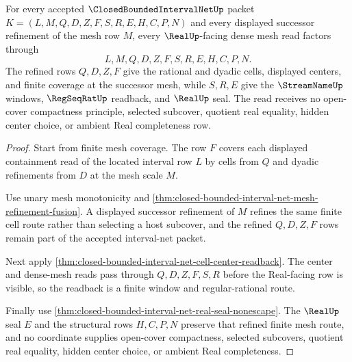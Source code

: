 \begin{theorem}
\label{thm:closed-bounded-interval-net-dense-mesh-readback}
For every accepted $\ClosedBoundedIntervalNetUp$ packet $K=(L,M,Q,D,Z,F,S,R,E,H,C,P,N)$ and every displayed successor refinement of the mesh row $M$, every $\RealUp$-facing dense mesh read factors through
$$
L,M,Q,D,Z,F,S,R,E,H,C,P,N.
$$
The refined rows $Q,D,Z,F$ give the rational and dyadic cells, displayed centers, and finite coverage at the successor mesh, while $S,R,E$ give the $\StreamNameUp$ windows, $\RegSeqRatUp$ readback, and $\RealUp$ seal. The read receives no open-cover compactness principle, selected subcover, quotient real equality, hidden center choice, or ambient Real completeness row.
\end{theorem}
\begin{proof}
Start from finite mesh coverage. The row $F$ covers each displayed containment read of the located interval row $L$ by cells from $Q$ and dyadic refinements from $D$ at the mesh scale $M$.

Use unary mesh monotonicity and \autoref{thm:closed-bounded-interval-net-mesh-refinement-fusion}. A displayed successor refinement of $M$ refines the same finite cell route rather than selecting a host subcover, and the refined $Q,D,Z,F$ rows remain part of the accepted interval-net packet.

Next apply \autoref{thm:closed-bounded-interval-net-cell-center-readback}. The center and dense-mesh reads pass through $Q,D,Z,F,S,R$ before the Real-facing row is visible, so the readback is a finite window and regular-rational route.

Finally use \autoref{thm:closed-bounded-interval-net-real-seal-nonescape}. The $\RealUp$ seal $E$ and the structural rows $H,C,P,N$ preserve that refined finite mesh route, and no coordinate supplies open-cover compactness, selected subcovers, quotient real equality, hidden center choice, or ambient Real completeness.
\end{proof}

